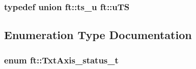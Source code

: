 \subsubsection[{\texorpdfstring{u\+TS}{uTS}}]{\setlength{\rightskip}{0pt plus 5cm}typedef union {\bf ft\+::ts\+\_\+u}  {\bf ft\+::u\+TS}}\hypertarget{namespaceft_a6b29d191a4ff3cd5738bcb38e4392811}{}\label{namespaceft_a6b29d191a4ff3cd5738bcb38e4392811}


\subsection{Enumeration Type Documentation}
\subsubsection[{\texorpdfstring{Txt\+Axis\+\_\+status\+\_\+t}{TxtAxis_status_t}}]{\setlength{\rightskip}{0pt plus 5cm}enum {\bf ft\+::\+Txt\+Axis\+\_\+status\+\_\+t}}\hypertarget{namespaceft_a05630ec9d5a49c43a00ca107cfe6b350}{}\label{namespaceft_a05630ec9d5a49c43a00ca107cfe6b350}
